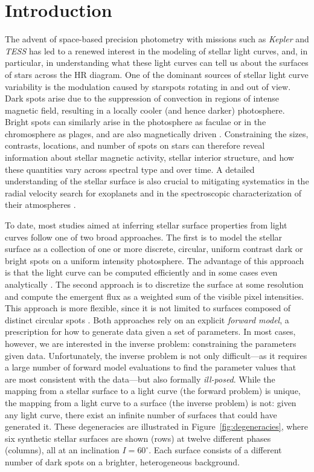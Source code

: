 \documentclass[modern]{aastex62}
\begin{document}
\section{Introduction}
\label{sec:intro}

The advent of space-based precision photometry with missions such as
\emph{Kepler} \citep{Borucki2010} and \emph{TESS} \citep{Ricker2015}
has led to a renewed interest in the modeling of stellar light curves,
and, in particular, in understanding what these light curves can tell
us about the surfaces of stars across the HR diagram. One of the dominant
sources of stellar light curve variability is the modulation caused
by starspots rotating in and out of view.
Dark spots arise due to the suppression of convection in regions of
intense magnetic field, resulting in a locally cooler (and hence darker)
photosphere. Bright spots can similarly
arise in the photosphere as faculae or in the chromosphere as plages, and
are also magnetically driven \citep[e.g.,][]{Berdyugina2005}.
%
Constraining the sizes,
contrasts, locations, and number of spots on stars can therefore reveal
information about stellar magnetic activity, stellar interior structure,
and how these quantities vary across spectral type and over time.
A detailed understanding of the stellar surface is also crucial to
mitigating systematics in the radial velocity search for exoplanets
\citep[e.g.,][]{Lanza2011} and in the spectroscopic characterization of their
atmospheres \citep[e.g.,][]{Rackham2018}.

To date, most studies aimed at inferring stellar surface
properties from light curves follow one of two broad approaches. The
first is to model the stellar surface as a collection of one or more
discrete, circular, uniform contrast dark or bright spots on a uniform
intensity photosphere.
The advantage of this approach is that
the light curve can be computed efficiently and in some cases even
analytically \citep[e.g.,][]{Davenport2015,Morris2017,Morris2020b}.
%
The second approach is to discretize the surface at some resolution
and compute the emergent flux as a weighted sum of the visible pixel intensities.
This approach is more flexible, since it is not limited to surfaces
composed of distinct circular spots \citep[e.g.,][]{Harmon2000,Roettenbacher2017}.
%
Both approaches rely on an explicit \emph{forward model}, a prescription for
how to generate data given a set of parameters. In most cases, however, we are interested
in the inverse problem: constraining the parameters given data.
%
Unfortunately, the inverse problem is not only difficult---as it requires
a large number of forward model evaluations to find the parameter values
that are most consistent with the
data---but also formally \emph{ill-posed}.
%
While the mapping from a stellar surface to a light curve (the forward
problem) is unique, the mapping from a light curve to a surface
(the inverse problem) is not:
given any light curve, there exist an infinite number of surfaces that
could have generated it. These degeneracies are illustrated in
Figure~\ref{fig:degeneracies}, where six synthetic stellar surfaces
are shown (rows) at twelve different phases (columns), all at an
inclination $I=60^\circ$. Each surface
consists of a different number of dark spots on a brighter, heterogeneous
background.
\end{document}
